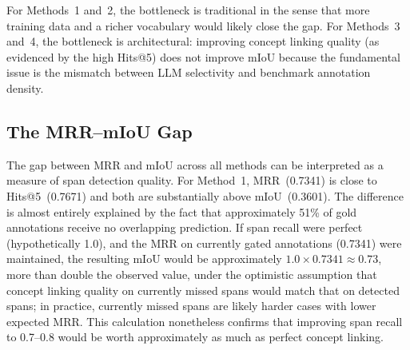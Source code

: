 \begin{table}[htbp]
\centering
\scriptsize
\caption{Span recall (IoU $\geq 0.5$) versus mIoU for all four methods.}
\label{tab:span_recall}
\end{table}

For Methods~1 and~2, the bottleneck is traditional in the sense that more training data and a richer vocabulary would likely close the gap. For Methods~3 and~4, the bottleneck is architectural: improving concept linking quality (as evidenced by the high Hits@5) does not improve mIoU because the fundamental issue is the mismatch between LLM selectivity and benchmark annotation density.

\subsection{The MRR–mIoU Gap}

The gap between MRR and mIoU across all methods can be interpreted as a measure of span detection quality. For Method~1, MRR~(0.7341) is close to Hits@5~(0.7671) and both are substantially above mIoU~(0.3601). The difference is almost entirely explained by the fact that approximately 51\% of gold annotations receive no overlapping prediction. If span recall were perfect (hypothetically 1.0), and the MRR on currently gated annotations (0.7341) were maintained, the resulting mIoU would be approximately $1.0 \times 0.7341 \approx 0.73$, more than double the observed value, under the optimistic assumption that concept linking quality on currently missed spans would match that on detected spans; in practice, currently missed spans are likely harder cases with lower expected MRR. This calculation nonetheless confirms that improving span recall to 0.7--0.8 would be worth approximately as much as perfect concept linking.

